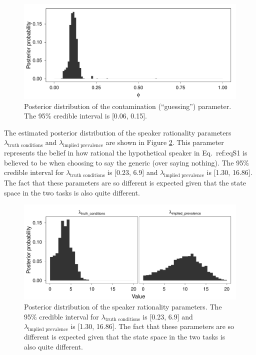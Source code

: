 \documentclass[10pt,letterpaper]{article}
\begin{document}
\begin{figure}
\centering
    \includegraphics[width=0.8\columnwidth]{asym-phi-2opts-phi-100k.pdf}
    \caption{Posterior distribution of the contamination (``guessing'') parameter. The 95\% credible interval is [0.06, 0.15].}
  \label{fig:phi2}
\end{figure}

The estimated posterior distribution of the speaker rationality parameters $\lambda_{\text{truth conditions}}$ and $\lambda_{\text{implied prevalence}}$ are shown in Figure \ref{fig:rationality2}. 
This parameter represents the belief in how rational the hypothetical speaker in Eq.~{ref:eqS1} is believed to be when choosing to say the generic (over saying nothing). 
The 95\% credible interval for $\lambda_{\text{truth conditions}}$ is [0.23, 6.9] and $\lambda_{\text{implied prevalence}}$ is [1.30, 16.86]. The fact that these parameters are so different is expected given that the state space in the two tasks is also quite different.


\begin{figure}
\centering
    \includegraphics[width=0.8\columnwidth]{asym-lambdas-2opts-phi-100k.pdf}
    \caption{Posterior distribution of the speaker rationality parameters. The 95\% credible interval for $\lambda_{\text{truth conditions}}$ is [0.23, 6.9] and  $\lambda_{\text{implied prevalence}}$ is [1.30, 16.86]. The fact that these parameters are so different is expected given that the state space in the two tasks is also quite different.}
  \label{fig:rationality2}
\end{figure}
\end{document}
